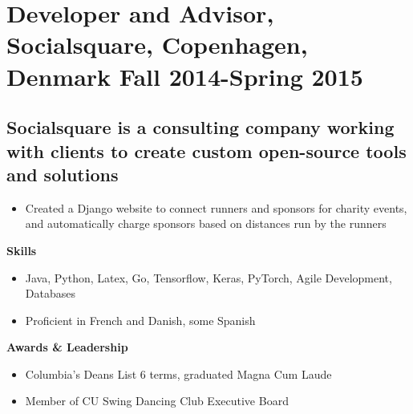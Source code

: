 \documentclass{article}
\begin{document}
\section*{\textbf{Developer and Advisor, Socialsquare, Copenhagen, Denmark \hfill Fall 2014-Spring 2015}}
\subsection*{Socialsquare is a consulting company working with clients to create custom open-source tools and solutions}
\begin{itemize}[noitemsep]
    \item Created a Django website to connect runners and sponsors for charity events, and automatically charge sponsors based on distances run by the runners
\end{itemize}


\noindent
{\large\textbf{Skills}}
\begin{itemize}[noitemsep]
    \item Java, Python, Latex, Go, Tensorflow, Keras, PyTorch, Agile Development, Databases
    \item Proficient in French and Danish, some Spanish
\end{itemize}
\noindent
{\large\textbf{Awards \& Leadership}}
\begin{itemize}[noitemsep]
    \item Columbia's Deans List 6 terms, graduated Magna Cum Laude
    \item Member of CU Swing Dancing Club Executive Board
\end{itemize}
\end{document}
